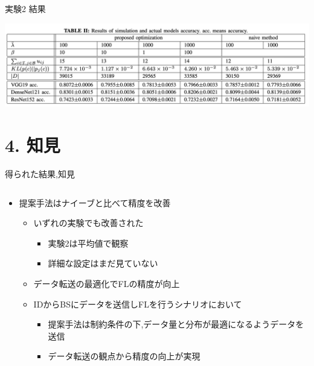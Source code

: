 \documentclass[unicode,12pt,aspectratio=169, dvipdfmx]{beamer}
\begin{document}
    \begin{frame}{実験2 結果}
        \begin{center}
            \includegraphics[scale=0.4]{figures/table.png}                    
        \end{center}
    \end{frame}





    \section{4. 知見}
    \begin{frame}{得られた結果,知見}
        \begin{columns}
            \begin{column}{.8\linewidth}
                \begin{itemize}
                   \item 提案手法はナイーブと比べて精度を改善
                   \begin{itemize}
                    \item いずれの実験でも改善された
                    \begin{itemize}
                        \item 実験2は平均値で観察
                        \item 詳細な設定はまだ見ていない
                    \end{itemize}
                    \item データ転送の最適化でFLの精度が向上
                    \item IDからBSにデータを送信しFLを行うシナリオにおいて
                    \begin{itemize}
                        \item 提案手法は制約条件の下,データ量と分布が最適になるようデータを送信
                        \item データ転送の観点から精度の向上が実現
                    \end{itemize}
                \end{itemize}
                \end{itemize}          
            \end{column}
        \end{columns}
    \end{frame}
\end{document}
